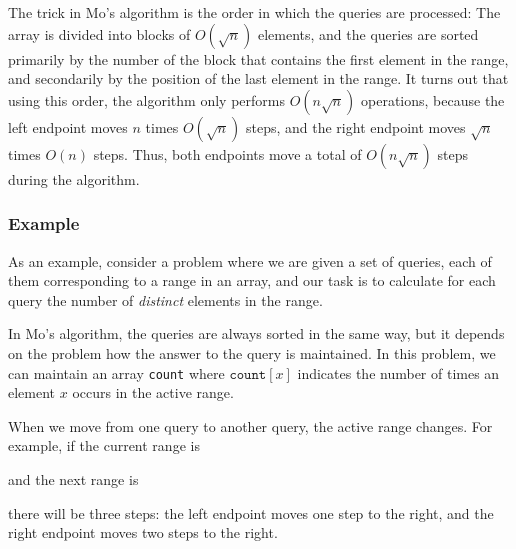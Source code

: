 The trick in Mo's algorithm is the order
in which the queries are processed:
The array is divided into blocks of $O(\sqrt n)$
elements, and the queries are sorted primarily by
the number of the block that contains the first element
in the range, and secondarily by the position of the
last element in the range.
It turns out that using this order, the algorithm
only performs $O(n \sqrt n)$ operations,
because the left endpoint moves
$n$ times $O(\sqrt n)$ steps,
and the right endpoint moves
$\sqrt n$ times $O(n)$ steps. Thus, both
endpoints move a total of $O(n \sqrt n)$ steps during the algorithm.

\subsubsection*{Example}

As an example, consider a problem
where we are given a set of queries,
each of them corresponding to a range in an array,
and our task is to calculate for each query
the number of \emph{distinct} elements in the range.

In Mo's algorithm, the queries are always sorted
in the same way, but it depends on the problem
how the answer to the query is maintained.
In this problem, we can maintain an array 
\texttt{count} where $\texttt{count}[x]$
indicates the number of times an element $x$
occurs in the active range.

When we move from one query to another query,
the active range changes.
For example, if the current range is
\begin{center}
\end{center}
and the next range is
\begin{center}
\end{center}
there will be three steps:
the left endpoint moves one step to the right,
and the right endpoint moves two steps to the right.


